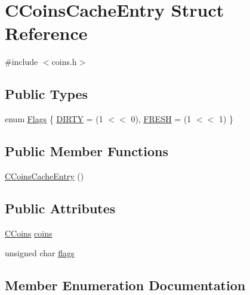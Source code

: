 \hypertarget{struct_c_coins_cache_entry}{}\section{C\+Coins\+Cache\+Entry Struct Reference}
\label{struct_c_coins_cache_entry}


{\ttfamily \#include $<$coins.\+h$>$}

\subsection*{Public Types}
\begin{DoxyCompactItemize}
\item 
enum \hyperlink{struct_c_coins_cache_entry_a1d5ac74da0f6ff5ab056e47ce79753c7}{Flags} \{ \hyperlink{struct_c_coins_cache_entry_a1d5ac74da0f6ff5ab056e47ce79753c7ac8cbd1b21d937e8618f9fecdf2c7223e}{D\+I\+R\+T\+Y} = (1 $<$$<$ 0), 
\hyperlink{struct_c_coins_cache_entry_a1d5ac74da0f6ff5ab056e47ce79753c7aae43958b088ff7b6e4f0daaafff00816}{F\+R\+E\+S\+H} = (1 $<$$<$ 1)
 \}
\end{DoxyCompactItemize}
\subsection*{Public Member Functions}
\begin{DoxyCompactItemize}
\item 
\hyperlink{struct_c_coins_cache_entry_ad241b5b23552ba45c0372b71f73d0f25}{C\+Coins\+Cache\+Entry} ()
\end{DoxyCompactItemize}
\subsection*{Public Attributes}
\begin{DoxyCompactItemize}
\item 
\hyperlink{class_c_coins}{C\+Coins} \hyperlink{struct_c_coins_cache_entry_a343585f1fcb810f9c21fc25ae42a1eba}{coins}
\item 
unsigned char \hyperlink{struct_c_coins_cache_entry_a05225c349f51777385e3a1c9b0eeaaed}{flags}
\end{DoxyCompactItemize}


\subsection{Member Enumeration Documentation}
\hypertarget{struct_c_coins_cache_entry_a1d5ac74da0f6ff5ab056e47ce79753c7}{}
